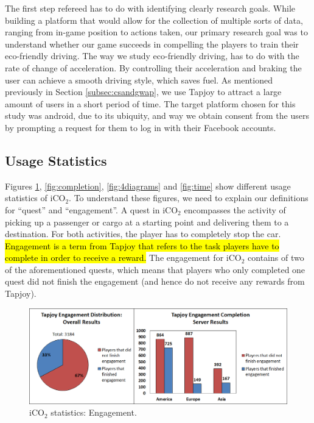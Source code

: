 \documentclass[preprint,authoryear,12pt]{elsarticle}
\newcommand{\hlc}[2][yellow]{ {\sethlcolor{#1} \hl{#2}} }
\begin{document}
The first step refereed has to do with identifying clearly research goals. While building a platform that would allow for the collection of multiple sorts of data, ranging from in-game position to actions taken, our primary research goal was to understand whether our game succeeds in compelling the players to train their eco-friendly driving.
The way we study eco-friendly driving, has to do with the rate of change of acceleration. By controlling their acceleration and braking the user can achieve a smooth driving style, which saves fuel.
As mentioned previously in Section \ref{subsec:csandgwap}, we use Tapjoy to attract a large amount of users in a short period of time.
The target platform chosen for this study was android, due to its ubiquity, and way we obtain consent from the users by prompting a request for them to log in with their Facebook accounts.




\subsection{Usage Statistics}
\label{subsec:usage_stats}

Figures \ref{fig:engagement}, \ref{fig:completion}, \ref{fig:4diagrams} and \ref{fig:time} show different usage statistics of iCO$_2$. To understand these figures, we need to explain our definitions for ``quest'' and ``engagement''. A quest in iCO$_2$ encompasses the activity of picking up a passenger or cargo at a starting point and delivering them to a destination. For both activities, the player has to completely stop the car.
\hlc[green]{Engagement is a term from Tapjoy that refers to the task players have to complete in order to receive a reward.} The engagement for iCO$_2$ contains of two of the aforementioned quests, which means that players who only completed one quest did not finish the engagement (and hence do not receive any rewards from Tapjoy).

\begin{figure}[htb]
	\begin{center}
		\includegraphics[width=.95\linewidth]{ijhcs14-img/engagement}
		\caption{iCO$_2$ statistics: Engagement.\label{fig:engagement}}
	\end{center}
\end{figure}
\end{document}
